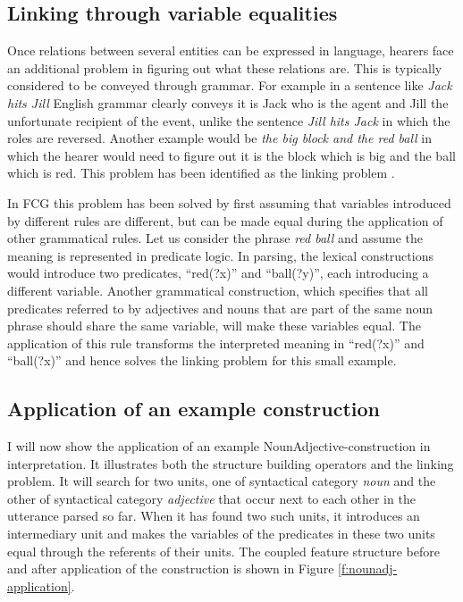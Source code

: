 \subsection{Linking through variable equalities}

Once relations between several entities can be expressed in language,
hearers face an additional problem in figuring out what these
relations are. This is typically considered to be conveyed through
grammar. For example in a sentence like \textit{Jack hits Jill} English
grammar clearly conveys it is Jack who is the agent and Jill the
unfortunate recipient of the event, unlike the sentence \textit{Jill hits
Jack} in which the roles are reversed. Another example would be \textit{the
big block and the red ball} in which the hearer would need to figure
out it is the block which is big and the ball which is red. This
problem has been identified as the linking problem
\citep{steels05linking}.

In FCG this problem has been solved by first assuming that variables
introduced by different rules are different, but can be made equal
during the application of other grammatical rules. Let us consider the
phrase \textit{red ball} and assume the meaning is represented in predicate
logic. In parsing, the lexical constructions would introduce two
predicates, ``red(?x)'' and ``ball(?y)'', each introducing a different
variable. Another grammatical construction, which specifies that all
predicates referred to by adjectives and nouns that are part of the
same noun phrase should share the same variable, will make these
variables equal. The application of this rule transforms the
interpreted meaning in ``red(?x)'' and ``ball(?x)'' and hence solves the
linking problem for this small example.

\subsection{Application of an example construction}

I will now show the application of an example
NounAdjective-construction in interpretation. It illustrates both the
structure building operators and the linking problem. It will search
for two units, one of syntactical category \emph{noun} and the other
of syntactical category \emph{adjective} that occur next to each other
in the utterance parsed so far. When it has found two such units, it
introduces an intermediary unit and makes the variables of the
predicates in these two units equal through the referents of their
units. The coupled feature structure before and after application of
the construction is shown in Figure \ref{f:nounadj-application}.

